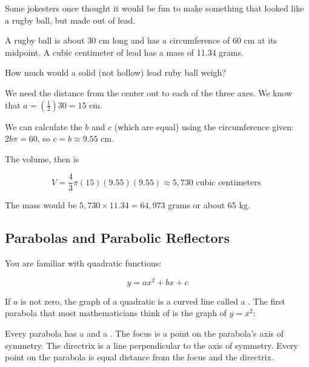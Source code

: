 \begin{Exercise}[title={Volume of Ruby Ball}, label=rugby_ball]

  Some jokesters once thought it would be fun to make something that looked like a rugby ball, but made out of lead.

  A rugby ball is about 30 cm long and has a circumference of 60 cm at
  its midpoint. A cubic centimeter of lead has a mass of 11.34 grams.

  How much would a solid (not hollow) lead ruby ball weigh?

\end{Exercise}
\begin{Answer}[ref=rugby_ball]

  We need the distance from the center out to each of the three axes.  We know that $a = \left(\frac{1}{2} \right) 30 = 15$ cm.

  We can calculate the $b$ and $c$ (which are equal) using the circumference given: $2b\pi = 60$, so $c = b \approx 9.55$ cm.

  The volume, then is
  
  $$V = \frac{4}{3} \pi (15)(9.55)(9.55) \approx 5,730 \text{ cubic centimeters }$$ 

  The mass would be $5,730 \times 11.34 = 64,973$ grams or about 65 kg.
\end{Answer}
  
\subsection{Parabolas and Parabolic Reflectors}

You are familiar with quadratic functions:

$$y = a x^2 + b x + c$$

If $a$ is not zero, the graph of a quadratic is a curved line called a
.  The first parabola that most mathematicians think of is the graph of $y = x^2$:


Every parabola has a  and a .  The
focus is a point on the parabola's axis of symmetry.  The directrix is
a line perpendicular to the axis of symmetry.  Every point on the
parabola is equal distance from the focus and the directrix.

